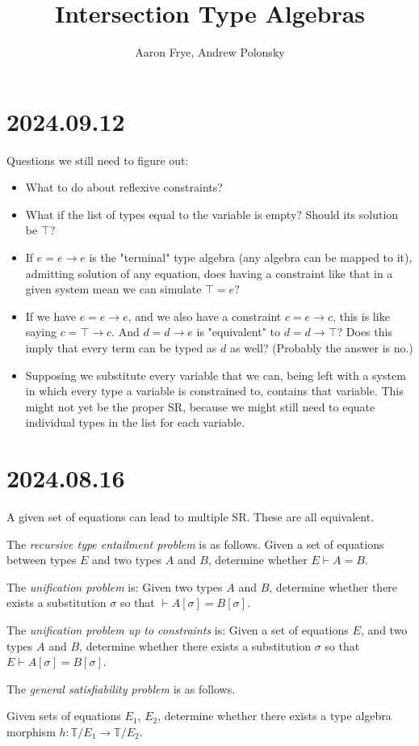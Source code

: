 \documentclass{scrartcl}
\title{Intersection Type Algebras}
\author{Aaron Frye, Andrew Polonsky}
\newcommand{\types}{\mathbb{T}}
\begin{document}
\section{2024.09.12}

Questions we still need to figure out:
\begin{itemize}
  \item What to do about reflexive constraints?
  \item What if the list of types equal to the variable is empty?
  Should its solution be $\top$?
  \item If $e = e \to e$ is the "terminal" type algebra
  (any algebra can be mapped to it), admitting solution of any equation,
  does having a constraint like that in a given system mean we can simulate
  $\top = e$?
  \item If we have $e = e \to e$, and we also have a constraint $c = e \to c$,
  this is like saying $c = \top \to c$.  And $d = d \to e$ is "equivalent" to
   $d = d \to \top$?  Does this imply that every term can be typed as $d$ as well?
   (Probably the answer is no.)
   \item Supposing we substitute every variable that we can,
   being left with a system in which every type a variable is constrained to,
   contains that variable.  This might not yet be the proper SR, because we
   might still need to equate individual types in the list for each variable.
\end{itemize}

\section{2024.08.16}

A given set of equations can lead to multiple SR.  These are all equivalent.

The \emph{recursive type entailment problem} is as follows.
Given a set of equations between types $E$ and two types $A$ and $B$,
determine whether $E \vdash A = B$.

The \emph{unification problem} is: Given two types $A$ and $B$,
determine whether there exists a substitution $\sigma$
so that $\vdash A[\sigma] = B[\sigma]$.

The \emph{unification problem up to constraints} is: Given a set of equations $E$,
and two types $A$ and $B$, determine whether there exists a substitution $\sigma$
so that $E \vdash A[\sigma] = B[\sigma]$.


The \emph{general satisfiability problem} is as follows.

Given sets of equations $E_1$, $E_2$, determine whether there exists
a type algebra morphism $h : \types/E_1 \to \types/E_2$.
\end{document}
